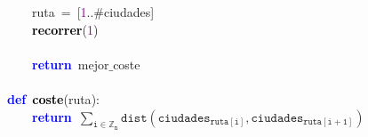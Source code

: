 \mbox{}\ \ \ \ ruta\ \textcolor{BrickRed}{=}\ \textcolor{BrickRed}{[}\textcolor{Purple}{1}\textcolor{BrickRed}{..}\textcolor{BrickRed}{\#}ciudades\textcolor{BrickRed}{]} \\
\mbox{}\ \ \ \ \textbf{\textcolor{Black}{recorrer}}\textcolor{BrickRed}{(}\textcolor{Purple}{1}\textcolor{BrickRed}{)} \\
\mbox{} \\
\mbox{}\ \ \ \ \textbf{\textcolor{Blue}{return}}\ mejor$\_$coste \\
\mbox{} \\
\mbox{}\textbf{\textcolor{Blue}{def}}\ \textbf{\textcolor{Black}{coste}}\textcolor{BrickRed}{(}ruta\textcolor{BrickRed}{):} \\
\mbox{}\ \ \ \ \textbf{\textcolor{Blue}{return}}\ $\mathtt{\sum_{i \in \mathbb{Z}_n} dist(ciudades_{ruta[i]}, ciudades_{ruta[i+1]})}$ \\
\mbox{} \\
\mbox{}

